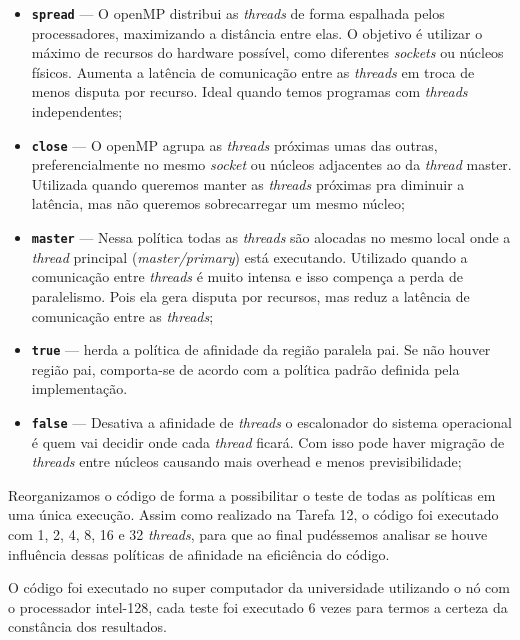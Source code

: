 \documentclass[a4paper, 12pt]{article}
\begin{document}
	\begin{itemize}
		\item \textbf{\texttt{spread}} — O openMP distribui as \textit{threads} de forma espalhada pelos processadores, maximizando a distância entre elas. O objetivo é utilizar o máximo de recursos do hardware possível, como diferentes \textit{sockets} ou núcleos físicos. Aumenta a latência de comunicação entre as \textit{threads} em troca de menos disputa por recurso. Ideal quando temos programas com \textit{threads} independentes;
		
		\item \textbf{\texttt{close}} — O openMP agrupa as \textit{threads} próximas umas das outras, preferencialmente no mesmo \textit{socket} ou núcleos adjacentes ao da \textit{thread} master. Utilizada quando queremos manter as \textit{threads} próximas pra diminuir a latência, mas não queremos sobrecarregar um mesmo núcleo;
		
		\item \textbf{\texttt{master}} — Nessa política todas as \textit{threads} são alocadas no mesmo local onde a \textit{thread} principal (\textit{master/primary}) está executando. Utilizado quando a comunicação entre \textit{threads} é muito intensa e isso compença a perda de paralelismo. Pois ela gera disputa por recursos, mas reduz a latência de comunicação entre as \textit{threads};
		
		\item \textbf{\texttt{true}} — herda a política de afinidade da região paralela pai. Se não houver região pai, comporta-se de acordo com a política padrão definida pela implementação.
		
		\item \textbf{\texttt{false}} — Desativa a afinidade de \textit{threads} o escalonador do sistema operacional é quem vai decidir onde cada \textit{thread} ficará. Com isso pode haver migração de \textit{threads} entre núcleos causando mais overhead e menos previsibilidade;
	\end{itemize}
	
	Reorganizamos o código de forma a possibilitar o teste de todas as políticas em uma única execução. Assim como realizado na Tarefa 12, o código foi executado com 1, 2, 4, 8, 16 e 32 \textit{threads}, para que ao final pudéssemos analisar se houve influência dessas políticas de afinidade na eficiência do código.
	
	O código foi executado no super computador da universidade utilizando o nó com o processador intel-128, cada teste foi executado 6 vezes para termos a certeza da constância dos resultados.
	
\end{document}
